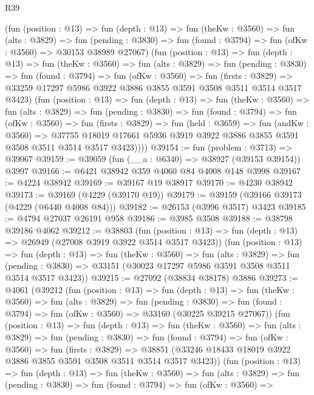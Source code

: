 \begin{lexlean}{R39}
\begin{coremodule}
          (fun (position : @13) =>
          fun (depth : @13) =>
          fun (theKw : @3560) =>
          fun (alts : @3829) =>
          fun (pending : @3830) =>
          fun (found : @3794) => fun (ofKw : @3560) => @30153 @38989 @27067)
          (fun (position : @13) =>
          fun (depth : @13) =>
          fun (theKw : @3560) =>
          fun (alts : @3829) =>
          fun (pending : @3830) =>
          fun (found : @3794) =>
          fun (ofKw : @3560) =>
          fun (firsts : @3829) =>
          @33259 @17297 @5986 @3922 @3886 @3855 @3591 @3508 @3511 @3514 @3517 @3423)
          (fun (position : @13) =>
          fun (depth : @13) =>
          fun (theKw : @3560) =>
          fun (alts : @3829) =>
          fun (pending : @3830) =>
          fun (found : @3794) =>
          fun (ofKw : @3560) =>
          fun (firsts : @3829) =>
          fun (held : @3659) =>
          fun (andKw : @3560) =>
          @37755 @18019 @17661 @5936 @3919 @3922 @3886 @3855 @3591 @3508 @3511 @3514 @3517 @3423))))
@39154 := fun (problem : @3713) => @39067
@39159 := @39059 (fun (__a : @6340) => @38927 (@39153 @39154)) @3997
@39166 := @6421 @38942 @359 @4060 @84 @4008 @148 @3998
@39167 := @4224 @38942
@39169 := @39167 @19 @38917
@39170 := @4230 @38942
@39173 := @39169 (@4229 (@39170 @19))
@39179 := @39159 (@39166 @39173 (@4229 (@6440 @4008 @84)))
@39182 := @26153 (@3996 @3517) @3423
@39185 := @4794 @27037 @26191 @958
@39186 := @3985 @3508
@39188 := @38798 @39186 @4062
@39212 := @38803
    (fun (position : @13) => fun (depth : @13) => @26949 (@27008 @3919 @3922 @3514 @3517 @3423))
    (fun (position : @13) =>
    fun (depth : @13) =>
    fun (theKw : @3560) =>
    fun (alts : @3829) =>
    fun (pending : @3830) => @33151 (@30023 @17297 @5986 @3591 @3508 @3511 @3514 @3517 @3423))
@39215 := @27092 (@38834 @38178) @3886
@39273 := @4061
    (@39212
      (fun (position : @13) =>
      fun (depth : @13) =>
      fun (theKw : @3560) =>
      fun (alts : @3829) =>
      fun (pending : @3830) =>
      fun (found : @3794) => fun (ofKw : @3560) => @33160 (@30225 @39215 @27067))
      (fun (position : @13) =>
      fun (depth : @13) =>
      fun (theKw : @3560) =>
      fun (alts : @3829) =>
      fun (pending : @3830) =>
      fun (found : @3794) =>
      fun (ofKw : @3560) =>
      fun (firsts : @3829) =>
      @38851 (@33246 @18433 @18019 @3922 @3886 @3855 @3591 @3508 @3511 @3514 @3517 @3423))
      (fun (position : @13) =>
      fun (depth : @13) =>
      fun (theKw : @3560) =>
      fun (alts : @3829) =>
      fun (pending : @3830) =>
      fun (found : @3794) =>
      fun (ofKw : @3560) =>

\end{coremodule}
\end{lexlean}
